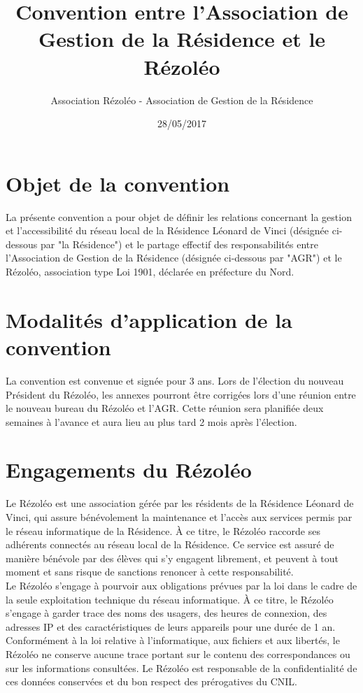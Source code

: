 \documentclass[12pt]{constitution}
\begin{document}
\title{Convention entre l'Association de Gestion de la Résidence et le Rézoléo}
\author{Association Rézoléo - Association de Gestion de la Résidence}
\date{28/05/2017}
\maketitle

\section{Objet de la convention}

    La présente convention a pour objet de définir les relations concernant la gestion et l'accessibilité du réseau local de la Résidence Léonard de Vinci (désignée ci-dessous par "la Résidence") et le partage effectif des responsabilités entre l'Association de Gestion de la Résidence (désignée ci-dessous par "AGR") et le Rézoléo, association type Loi 1901, déclarée en préfecture du Nord.


\section{Modalités d'application de la convention}

    La convention est convenue et signée pour 3 ans. Lors de l'élection du nouveau Président du Rézoléo, les annexes pourront être corrigées lors d'une réunion entre le nouveau bureau du Rézoléo et l'AGR. Cette réunion sera planifiée deux semaines à l'avance et aura lieu au plus tard 2 mois après l'élection.


\section{Engagements du Rézoléo}

    Le Rézoléo est une association gérée par les résidents de la Résidence Léonard de Vinci, qui assure bénévolement la maintenance et l'accès aux services permis par le réseau informatique de la Résidence. À ce titre, le Rézoléo raccorde ses adhérents connectés au réseau local de la Résidence. Ce service est assuré de manière bénévole par des élèves qui s'y engagent librement, et peuvent à tout moment et sans risque de sanctions renoncer à cette responsabilité.\\


    Le Rézoléo s'engage à pourvoir aux obligations prévues par la loi dans le cadre de la seule exploitation technique du réseau informatique. À ce titre, le Rézoléo s'engage à garder trace des noms des usagers, des heures de connexion, des adresses IP et des caractéristiques de leurs appareils pour une durée de 1 an. Conformément à la loi relative à l'informatique, aux fichiers et aux libertés, le Rézoléo ne conserve aucune trace portant sur le contenu des correspondances ou sur les informations consultées. Le Rézoléo est responsable de la confidentialité de ces données conservées et du bon respect des prérogatives du CNIL.\\
\end{document}
